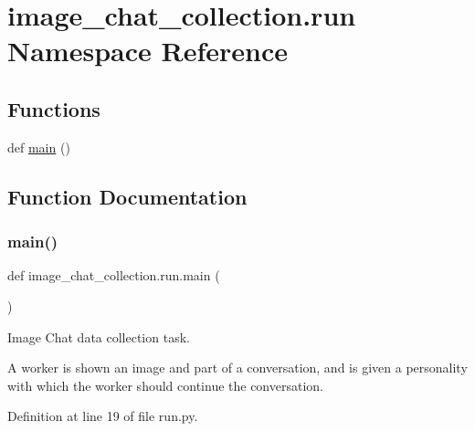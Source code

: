\hypertarget{namespaceimage__chat__collection_1_1run}{}\section{image\+\_\+chat\+\_\+collection.\+run Namespace Reference}
\label{namespaceimage__chat__collection_1_1run}
\subsection*{Functions}
\begin{DoxyCompactItemize}
\item 
def \hyperlink{namespaceimage__chat__collection_1_1run_a703a00a419d81661c189b6603ab72769}{main} ()
\end{DoxyCompactItemize}


\subsection{Function Documentation}
\mbox{\label{namespaceimage__chat__collection_1_1run_a703a00a419d81661c189b6603ab72769}} 
\subsubsection{\texorpdfstring{main()}{main()}}
{\footnotesize\ttfamily def image\+\_\+chat\+\_\+collection.\+run.\+main (\begin{DoxyParamCaption}{ }\end{DoxyParamCaption})}

\begin{DoxyVerb}Image Chat data collection task.

A worker is shown an image and part of a conversation, and is given a personality
with which the worker should continue the conversation.
\end{DoxyVerb}
 

Definition at line 19 of file run.\+py.



